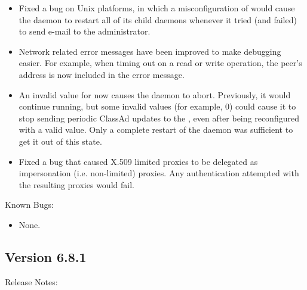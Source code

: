 \begin{itemize}
\item Fixed a bug on Unix platforms, in which a misconfiguration of
 would cause the  daemon to restart
all of its child
daemons whenever it tried (and failed) to send e-mail to the
administrator.

\item Network related error messages have been improved to make debugging
easier.  For example, when timing out on a read or write operation, the
peer's address is now included in the error message.

\item An invalid value for  now causes
the  daemon to abort.  Previously, it would continue running,
but some invalid values (for example, 0) could cause it to stop sending
periodic ClassAd updates to the , even after being
reconfigured with a valid value.  Only a complete restart of
the  daemon was sufficient to get it out of this state.

\item Fixed a bug that caused X.509 limited proxies to be delegated as 
impersonation (i.e. non-limited) proxies. Any authentication attempted
with the resulting proxies would fail.

\end{itemize}

\noindent Known Bugs:
\begin{itemize}

\item None.

\end{itemize}


\subsection*{\label{sec:New-6-8-1}Version 6.8.1}

\noindent Release Notes:

